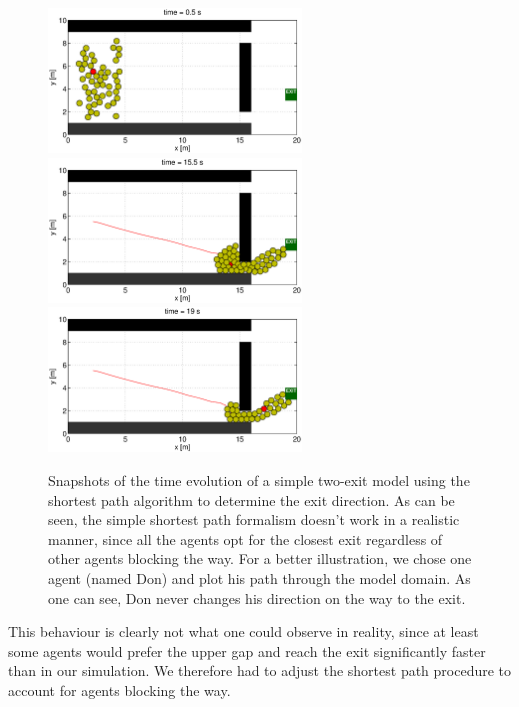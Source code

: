 \documentclass[11pt]{article}
\begin{document}
\begin{figure}
	\centering
	\includegraphics[width=0.6\textwidth]{figures/TwoExitsShortestPath_000050.eps}
	\qquad
	\includegraphics[width=0.6\textwidth]{figures/TwoExitsShortestPath_001550.eps}
	\qquad
	\includegraphics[width=0.6\textwidth]{figures/TwoExitsShortestPath_001900.eps}
	\caption{Snapshots of the time evolution of a simple two-exit model using the shortest path algorithm to determine the exit direction. As can be seen, the simple shortest path formalism doesn't work in a realistic manner, since all the agents opt for the closest exit regardless of other agents blocking the way. For a better illustration, we chose one agent (named Don) and plot his path through the model domain. As one can see, Don never changes his direction on the way to the exit.}
	\label{fig:two_exits1}
\end{figure}

This behaviour is clearly not what one could observe in reality, since at least some agents would prefer the upper gap and reach the exit significantly faster than in our simulation. We therefore had to adjust the shortest path procedure to account for agents blocking the way.
\end{document}
